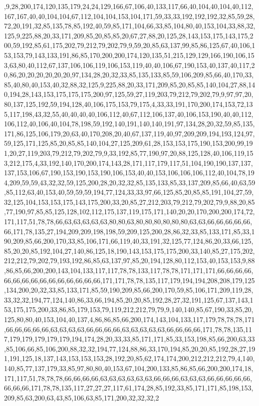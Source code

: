 ,9,28,200,174,120,135,179,24,24,129,166,67,106,40,133,117,66,40,104,40,104,40,112,167,167,40,40,104,104,67,112,104,104,153,104,171,59,33,33,192,192,192,32,85,59,28,72,20,191,32,85,135,78,85,192,40,59,85,171,104,66,33,85,104,80,40,153,104,33,88,32,125,9,225,88,20,33,171,209,85,20,85,85,20,67,27,88,20,125,28,143,153,175,143,175,200,59,192,85,61,175,202,79,212,79,202,79,9,59,20,85,63,137,99,85,86,125,67,40,106,153,153,79,143,133,191,86,85,170,200,200,174,120,135,51,215,129,129,166,190,106,153,63,80,40,112,67,137,106,106,119,106,153,119,40,40,106,67,190,153,40,137,40,117,20,86,20,20,20,20,20,20,97,134,28,20,32,33,85,135,133,85,59,106,209,85,66,40,170,33,85,40,80,40,153,40,32,88,32,125,9,225,88,20,33,171,209,85,20,85,85,140,104,27,88,140,194,28,143,153,175,175,175,200,97,125,59,27,119,203,79,212,79,202,79,9,97,97,20,80,137,125,192,59,194,128,40,106,175,153,79,175,4,33,33,191,170,200,174,153,72,135,117,198,43,32,55,40,40,40,40,106,112,40,67,112,106,137,40,106,153,190,40,40,112,106,112,40,106,40,104,78,198,59,192,140,191,140,140,191,97,134,28,20,32,59,85,135,171,86,125,106,179,20,63,40,170,208,20,40,67,137,119,40,97,209,209,194,193,124,97,59,125,171,125,85,20,85,85,140,104,27,125,209,61,28,153,153,175,190,153,200,99,191,20,27,119,203,79,212,79,202,79,9,33,192,85,77,190,97,20,88,125,128,40,106,119,153,212,175,4,33,192,140,170,200,174,143,28,171,117,179,117,51,104,190,190,137,137,137,153,106,67,190,153,190,153,190,106,153,40,40,153,106,106,106,112,40,104,78,194,209,59,59,43,32,32,59,125,200,28,20,32,32,85,135,133,85,33,137,209,85,66,40,63,59,85,112,63,40,153,40,59,59,59,194,77,124,33,33,97,66,125,85,20,85,85,191,104,27,59,32,125,104,153,153,175,143,175,200,33,20,85,27,212,203,79,212,79,202,79,9,88,20,85,77,190,97,85,85,125,128,102,112,175,137,119,175,171,140,20,20,170,200,200,174,72,171,117,51,78,78,66,63,63,63,63,63,80,80,63,80,80,80,80,80,80,63,63,66,66,66,66,66,66,171,78,135,27,194,209,209,198,198,59,209,125,200,28,86,32,33,85,133,171,85,33,190,209,85,66,200,170,33,85,106,171,66,119,40,33,191,32,125,77,124,86,20,33,66,125,85,20,20,85,192,104,27,140,86,125,18,190,143,153,175,175,200,33,140,85,27,175,202,212,212,79,202,79,193,192,86,85,63,137,97,85,20,194,128,80,112,153,40,153,153,9,88,86,85,66,200,200,143,104,133,117,117,78,78,133,117,78,78,171,171,171,66,66,66,66,66,66,66,66,66,66,66,66,66,66,66,171,171,78,78,135,117,179,194,194,208,208,179,125,134,200,20,32,33,85,133,171,85,59,190,209,85,66,200,170,59,85,106,171,209,119,28,33,32,32,194,77,124,140,86,33,66,194,85,20,20,85,192,28,27,32,191,125,67,137,143,153,175,175,200,33,86,85,179,153,79,119,212,212,79,79,9,140,140,85,67,190,33,85,20,125,80,80,40,153,104,40,137,4,86,86,85,66,200,174,143,104,133,117,179,78,78,78,171,66,66,66,66,66,63,63,63,63,66,66,66,66,63,63,63,63,63,66,66,66,66,171,78,78,135,117,179,179,179,179,179,194,174,28,20,33,33,85,171,171,85,33,153,198,85,66,200,63,33,85,106,66,85,106,200,88,32,32,194,77,124,88,86,33,170,194,85,20,20,85,192,28,27,191,191,125,18,137,143,153,153,153,28,192,20,85,62,174,174,200,212,212,212,79,4,140,140,85,77,137,179,33,85,97,80,80,40,153,67,104,200,133,85,86,85,66,200,200,174,18,171,117,51,78,78,78,66,66,66,66,63,63,63,63,63,63,66,66,66,63,63,63,66,66,66,66,66,66,66,66,171,78,78,135,117,27,27,27,117,61,174,28,85,192,33,85,171,171,85,198,153,209,85,63,200,63,43,85,106,63,85,171,200,32,32,32,2